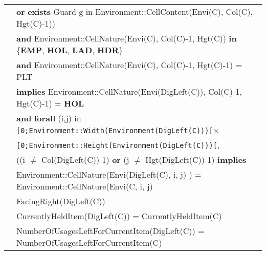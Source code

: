 \documentclass[7pt]{article}
\begin{document}
\begin{tabular}{rl}
& \quad\quad \textbf{or} \textbf{exists} Guard g {in} Environment::CellContent(Envi(C), Col(C), Hgt(C)-1)) \\
& \quad \textbf{and} Environment::CellNature(Envi(C), Col(C)-1, Hgt(C)) \textbf{in} \{\textbf{EMP}, \textbf{HOL}, \textbf{LAD}, \textbf{HDR}\} \\
& \quad \textbf{and}  Environment::CellNature(Envi(C), Col(C)-1, Hgt(C)-1) = PLT \\
& \quad \textbf{implies} Environment::CellNature(Envi(DigLeft(C)), Col(C)-1, Hgt(C)-1) = \textbf{HOL} \\
& \quad\quad \textbf{and} {\textbf{forall}} (i,j) {in} \texttt{[0;Environment::Width(Environment(DigLeft(C)))[}× \\ & \quad\quad\quad\quad\quad\quad\quad\quad\quad\quad\texttt{[0;Environment::Height(Environment(DigLeft(C)))[}, \\
       & \quad\quad\quad\quad\quad\quad ((i $\neq$ Col(DigLeft(C))-1) \textbf{or}  (j $\neq$ Hgt(DigLeft(C))-1) \textbf{implies} \\
       & \quad\quad\quad\quad\quad\quad\quad Environment::CellNature(Envi(DigLeft(C), i, j) ) = Environment::CellNature(Envi(C, i, j) \\
& FacingRight(DigLeft(C)) \\
& CurrentlyHeldItem(DigLeft(C)) = CurrentlyHeldItem(C) \\
& NumberOfUsagesLeftForCurrentItem(DigLeft(C)) = NumberOfUsagesLeftForCurrentItem(C) \\

\end{tabular}
\newpage
\end{document}
